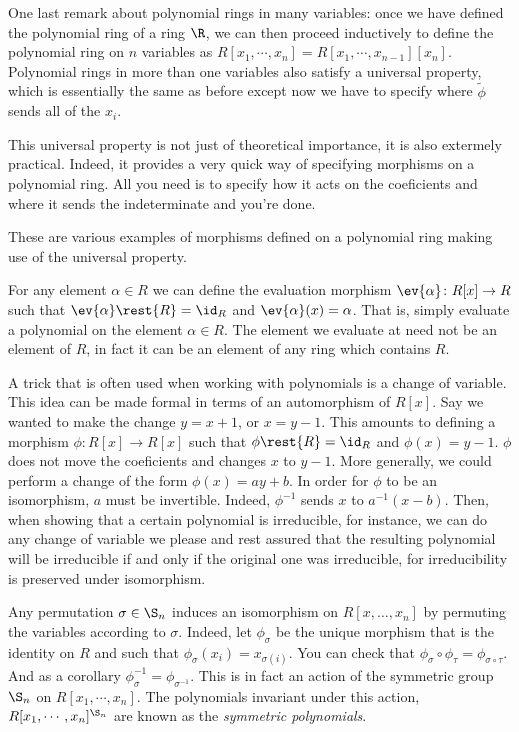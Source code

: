 \documentclass[12pt,oneside]{book}
\begin{document}
One last remark about polynomial rings in many variables: once we have defined the polynomial ring of a ring \( \R \), we can then proceed inductively to define the polynomial ring on \( n \) variables as \( R[x_1, \cdots, x_n] = R[x_1, \cdots, x_{n-1}][x_n] \). Polynomial rings in more than one variables also satisfy a universal property, which is essentially the same as before except now we have to specify where \( \tilde{\phi} \) sends all of the \( x_i \).

This universal property is not just of theoretical importance, it is also extermely practical. Indeed, it provides a very quick way of specifying morphisms on a polynomial ring. All you need is to specify how it acts on the coeficients and where it sends the indeterminate and you're done.

\begin{example}\label{exe:morphisms on polynomial rings}
	These are various examples of morphisms defined on a polynomial ring making use of the universal property.
	\begin{points}
	\item For any element \( \alpha \in R \) we can define the evaluation morphism \( \ev{\alpha} \colon R[x] \to R \) such that \( \ev{\alpha}\rest{R} = \id_R \) and \( \ev{\alpha}(x) = \alpha \). That is, simply evaluate a polynomial on the element \( \alpha \in R \). The element we evaluate at need not be an element of \( R \), in fact it can be an element of any ring which contains \( R \). 

	\item A trick that is often used when working with polynomials is a change of variable. This idea can be made formal in terms of an automorphism of \( R[x] \). Say we wanted to make the change \( y = x+1 \), or \( x = y-1 \). This amounts to defining a morphism \( \phi \colon R[x] \to R[x] \) such that \( \phi \rest{R} = \id_R \) and \( \phi(x) = y-1 \). \( \phi \) does not move the coeficients and changes \( x \) to \( y-1 \). More generally, we could perform a change of the form \( \phi(x) = ay + b \). In order for \( \phi \) to be an isomorphism, \( a \) must be invertible. Indeed, \( \phi^{-1} \) sends \( x \) to \( a^{-1}(x - b) \). Then, when showing that a certain polynomial is irreducible, for instance, we can do any change of variable we please and rest assured that the resulting polynomial will be irreducible if and only if the original one was irreducible, for irreducibility is preserved under isomorphism.	
	\item Any permutation \( \sigma \in \S_n \) induces an isomorphism on \( R[x, \dots, x_n] \) by permuting the variables according to \( \sigma \). Indeed, let \( \phi_{\sigma} \) be the unique morphism that is the identity on \( R \) and such that \( \phi_{\sigma}(x_i) = x_{\sigma(i)} \). You can check that \( \phi_{\sigma} \circ \phi_{\tau} = \phi_{\sigma \circ \tau} \). And as a corollary \( \phi_{\sigma}^{-1} = \phi_{\sigma^{-1}} \). This is in fact an action of the symmetric group \( \S_n \) on \( R[x_1, \cdots, x_n] \). The polynomials invariant under this action, \( R[x_1, \cdots, x_n]^{\S_n} \) are known as the \emph{symmetric polynomials}.
	\end{points}
\end{example}
\end{document}
